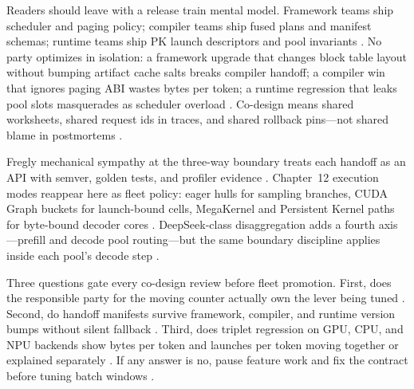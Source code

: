 Readers should leave with a release train mental model. Framework teams ship scheduler and paging policy; compiler teams ship fused plans and manifest schemas; runtime teams ship PK launch descriptors and pool invariants \citep{yirage2026,chen2020compilerbasedhardw,patel2025llminference,kwon2023vllm,taxbreak2026,memoryfloor2026,dlbook}. No party optimizes in isolation: a framework upgrade that changes block table layout without bumping artifact cache salts breaks compiler handoff; a compiler win that ignores paging ABI wastes bytes per token; a runtime regression that leaks pool slots masquerades as scheduler overload \citep{kwon2023vllm,yirage2026,chen2020compilerbasedhardw,patel2025llminference,memoryfloor2026,taxbreak2026,dlbook}. Co-design means shared worksheets, shared request ids in traces, and shared rollback pins---not shared blame in postmortems \citep{patel2025llminference,yirage2026,chen2020compilerbasedhardw,kwon2023vllm,dlbook}.

Fregly mechanical sympathy at the three-way boundary treats each handoff as an API with semver, golden tests, and profiler evidence \citep{patel2025llminference,yirage2026,chen2020compilerbasedhardw,kwon2023vllm,taxbreak2026,memoryfloor2026,dao2022flashattention,nvidia2024cudagraphs,dlbook}. Chapter~12 execution modes reappear here as fleet policy: eager hulls for sampling branches, CUDA Graph buckets for launch-bound cells, MegaKernel and Persistent Kernel paths for byte-bound decoder cores \citep{nvidia2024cudagraphs,yirage2026,taxbreak2026,memoryfloor2026,chen2020compilerbasedhardw,patel2025llminference,kwon2023vllm,liu2024deepseekv3,dao2022flashattention,dlbook}. DeepSeek-class disaggregation adds a fourth axis---prefill and decode pool routing---but the same boundary discipline applies inside each pool's decode step \citep{liu2024deepseekv3,patel2025llminference,yirage2026,chen2020compilerbasedhardw,kwon2023vllm,dlbook}.

Three questions gate every co-design review before fleet promotion. First, does the responsible party for the moving counter actually own the lever being tuned \citep{patel2025llminference,taxbreak2026,memoryfloor2026,yirage2026,chen2020compilerbasedhardw,dlbook}. Second, do handoff manifests survive framework, compiler, and runtime version bumps without silent fallback \citep{kwon2023vllm,yirage2026,chen2020compilerbasedhardw,patel2025llminference,dlbook}. Third, does triplet regression on GPU, CPU, and NPU backends show bytes per token and launches per token moving together or explained separately \citep{taxbreak2026,memoryfloor2026,patel2025llminference,yirage2026,chen2020compilerbasedhardw,amd2024xdna,amd2024aie,dlbook}. If any answer is no, pause feature work and fix the contract before tuning batch windows \citep{patel2025llminference,yirage2026,chen2020compilerbasedhardw,kwon2023vllm,dlbook}.

